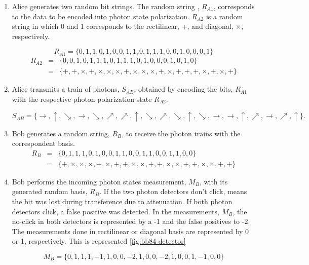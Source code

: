 \begin{refsection}
\begin{enumerate}
	\item Alice generates two random bit strings. The random string , $R_{A1}$, corresponds to the data to be encoded into photon state polarization. $R_{A2}$ is a random string in which 0 and 1 corresponds to the rectilinear, +, and diagonal, $\times$, respectively.
	
	$$ R_{A1} = \{0,1,1,0,1,0,0,1,1,0,1,1,1,0,0,1,0,0,0,1\}$$
	\begin{eqnarray}
		R_{A2} &=& \{0,0,1,0,1,1,1,0,1,1,1,0,1,0,0,0,1,0,1,0\} \nonumber \\
		&=& \{+,+,\times,+,\times, \times, \times, +,\times, \times, \times,+,\times,+,+,+,\times,+,\times,+\}\nonumber
	\end{eqnarray}
	
	\item Alice transmits a train of photons, $S_{AB}$, obtained by encoding the bits, $R_{A1}$ with the respective photon polarization state $R_{A2}$.
	
	$$S_{AB} = \{\to, \uparrow, \searrow, \to, \searrow, \nearrow, \nearrow, \uparrow, \searrow, \nearrow, \searrow, \uparrow, \searrow, \to, \to, \uparrow, \nearrow, \to, \nearrow, \uparrow\}.$$
	
	\item Bob generates a random string, $R_{B}$, to receive the photon trains with the correspondent basis.
	\begin{eqnarray}
		R_{B} &=& \{0,1,1,1,0,1,0,0,1,1,0,0,1,1,0,0,1,1,0,0\} \nonumber\\
		&=&\{+,\times,\times,\times,+,\times,+,+,\times,\times,+,+,\times,\times,+,+,\times,\times,+,+\} \nonumber
	\end{eqnarray}
	
	\item Bob performs the incoming photon states measurement, $M_{B}$, with its generated random basis, $R_{B}$. If the two photon detectors don't click, means the bit was lost during transference due to attenuation. If both photon detectors click, a false positive was detected. In the measurements, $M_{B}$, the no-click in both detectors is represented by a -1 and the false positives to -2. The measurements done in rectilinear or diagonal basis are represented by 0 or 1, respectively. This is represented \ref{fig:bb84 detector}
	
	$$M_{B} = \{0,1,1,1,-1,1,0,0,-2,1,0,0,-2,1,0,0,1,-1,0,0\}$$	


\end{enumerate}
\end{refsection}
